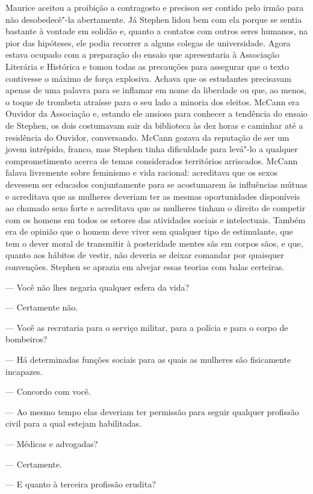 Maurice aceitou a proibição a contragosto e precisou ser contido
pelo irmão para não desobedecê"-la abertamente.  Já Stephen lidou bem
com ela porque se sentia bastante à vontade em solidão e, quanto a
contatos com outros seres humanos, na pior das hipóteses, ele podia
recorrer a alguns colegas de universidade.  Agora estava ocupado com a
preparação do ensaio que apresentaria à Associação Literária e
Histórica e tomou todas as precauções para assegurar que o texto
contivesse o máximo de força explosiva.  Achava que os estudantes
precisavam apenas de uma palavra para se inflamar em nome da liberdade
ou que, ao menos, o toque de trombeta atraísse para o seu lado a
minoria dos eleitos.  McCann era Ouvidor da Associação e, estando ele
ansioso para conhecer a tendência do ensaio de Stephen, os dois
costumavam sair da biblioteca às dez horas e caminhar até a residência
do Ouvidor, conversando.  McCann gozava da reputação de ser um jovem
intrépido, franco, mas Stephen tinha dificuldade para levá"-lo a
qualquer comprometimento acerca de temas considerados territórios
arriscados.  McCann falava livremente sobre feminismo e vida racional:
acreditava que os sexos devessem ser educados conjuntamente para se
acostumarem às influências mútuas e acreditava que as mulheres deveriam
ter as mesmas oportunidades disponíveis ao chamado sexo forte e
acreditava que as mulheres tinham o direito de competir com os homens
em todos os setores das atividades sociais e intelectuais.  Também era
de opinião que o homem deve viver sem qualquer tipo de estimulante, que
tem o dever moral de transmitir à posteridade mentes sãs em corpos
sãos, e que, quanto aos hábitos de vestir, não deveria se deixar
comandar por quaisquer convenções.  Stephen se aprazia em alvejar essas
teorias com balas certeiras.

--- Você não lhes negaria qualquer esfera da vida?

--- Certamente não.

--- Você as recrutaria para o serviço militar, para a polícia e
para o corpo de bombeiros?

--- Há determinadas funções sociais para as quais as mulheres são
fisicamente incapazes.

--- Concordo com você.

--- Ao mesmo tempo elas deveriam ter permissão para seguir
qualquer profissão civil para a qual estejam habilitadas.

--- Médicas e advogadas?

--- Certamente.

--- E quanto à terceira profissão erudita?

